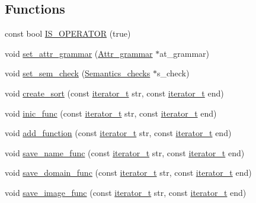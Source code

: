 \subsection*{Functions}
\begin{DoxyCompactItemize}
\item 
const bool \hyperlink{namespacegenevalmag_a29dbe8034050c247526ecae47ff95529}{IS\_\-OPERATOR} (true)
\item 
void \hyperlink{namespacegenevalmag_ae77bed22019c46ef3b6d11c18c87a85f}{set\_\-attr\_\-grammar} (\hyperlink{classgenevalmag_1_1Attr__grammar}{Attr\_\-grammar} $\ast$at\_\-grammar)
\item 
void \hyperlink{namespacegenevalmag_ab68c3ea3b4064fbd96451dd2a094ad34}{set\_\-sem\_\-check} (\hyperlink{classgenevalmag_1_1Semantics__checks}{Semantics\_\-checks} $\ast$s\_\-check)
\item 
void \hyperlink{namespacegenevalmag_a8fe47e97e9f000f1eb35ee9e86b2a5c0}{create\_\-sort} (const \hyperlink{namespacegenevalmag_a64946721fb97e58be670a468bf8e7056}{iterator\_\-t} str, const \hyperlink{namespacegenevalmag_a64946721fb97e58be670a468bf8e7056}{iterator\_\-t} end)
\item 
void \hyperlink{namespacegenevalmag_a815257dc75d0f8a85662cdfc618c2187}{inic\_\-func} (const \hyperlink{namespacegenevalmag_a64946721fb97e58be670a468bf8e7056}{iterator\_\-t} str, const \hyperlink{namespacegenevalmag_a64946721fb97e58be670a468bf8e7056}{iterator\_\-t} end)
\item 
void \hyperlink{namespacegenevalmag_aff5e0f0cff477c34b63116d99dfbe9b0}{add\_\-function} (const \hyperlink{namespacegenevalmag_a64946721fb97e58be670a468bf8e7056}{iterator\_\-t} str, const \hyperlink{namespacegenevalmag_a64946721fb97e58be670a468bf8e7056}{iterator\_\-t} end)
\item 
void \hyperlink{namespacegenevalmag_af3954dcbe7a20818880776138409f413}{save\_\-name\_\-func} (const \hyperlink{namespacegenevalmag_a64946721fb97e58be670a468bf8e7056}{iterator\_\-t} str, const \hyperlink{namespacegenevalmag_a64946721fb97e58be670a468bf8e7056}{iterator\_\-t} end)
\item 
void \hyperlink{namespacegenevalmag_ae333368e344fd2e4542788afb8d9990e}{save\_\-domain\_\-func} (const \hyperlink{namespacegenevalmag_a64946721fb97e58be670a468bf8e7056}{iterator\_\-t} str, const \hyperlink{namespacegenevalmag_a64946721fb97e58be670a468bf8e7056}{iterator\_\-t} end)
\item 
void \hyperlink{namespacegenevalmag_a6c5fe5628b5ac4b3e2d9c4fc93985abe}{save\_\-image\_\-func} (const \hyperlink{namespacegenevalmag_a64946721fb97e58be670a468bf8e7056}{iterator\_\-t} str, const \hyperlink{namespacegenevalmag_a64946721fb97e58be670a468bf8e7056}{iterator\_\-t} end)

\end{DoxyCompactItemize}
